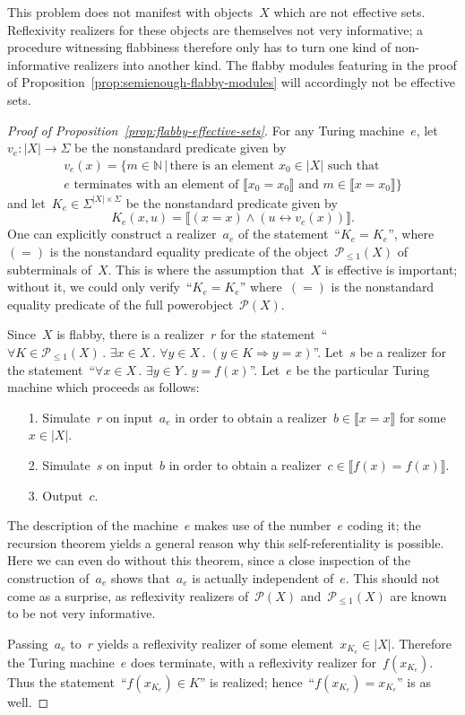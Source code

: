\documentclass[oneside]{amsart}
\theoremstyle{definition}
\theoremstyle{plain}
\theoremstyle{remark}
\newcommand{\NN}{\mathbb{N}}
\renewcommand{\P}{\mathcal{P}}
\renewcommand{\_}{\mathpunct{.}\,}
\begin{document}
This problem does not manifest with objects~$X$ which are not effective sets.
Reflexivity realizers for these objects are themselves not very informative;
a procedure witnessing flabbiness therefore only has to turn one kind of
non-informative realizers into another kind. The flabby modules featuring in
the proof of Proposition~\ref{prop:semienough-flabby-modules} will accordingly
not be effective sets.

\begin{proof}[Proof of Proposition~\ref{prop:flabby-effective-sets}]
For any Turing machine~$e$, let~$v_e : |X| \to \Sigma$ be the nonstandard
predicate given by
\begin{multline*}
  v_e(x) = \{ m \in \NN \,|\,
  \text{there is an element~$x_0 \in |X|$ such that} \\
  \text{$e$ terminates with an element of~$\llbracket x_0 = x_0 \rrbracket$ and
  $m \in \llbracket x = x_0 \rrbracket$} \}
\end{multline*}
and let~$K_e \in \Sigma^{|X| \times \Sigma}$ be the nonstandard predicate given by
\[ K_e(x,u) = \llbracket (x = x) \wedge (u \leftrightarrow v_e(x)) \rrbracket. \]
One can explicitly construct a realizer~$a_e$ of the statement~``$K_e = K_e$'',
where~$({=})$ is the nonstandard equality predicate of the object~$\P_{\leq1}(X)$
of subterminals of~$X$. This is where the assumption that~$X$ is effective is
important; without it, we could only verify~``$K_e = K_e$'' where~$({=})$ is
the nonstandard equality predicate of the full powerobject~$\P(X)$.

Since~$X$ is flabby, there is a realizer~$r$ for the statement~``$\forall K \in
\P_{\leq1}(X)\_ \exists x \in X\_ \forall y \in X\_ (y \in K \Rightarrow y =
x)$''. Let~$s$ be a realizer for the statement~``$\forall x \in X\_ \exists y
\in Y\_ y = f(x)$''. Let~$e$ be the particular Turing machine which proceeds as
follows:
\begin{enumerate}
\item[1.] Simulate~$r$ on input~$a_e$ in order to obtain a realizer~$b \in
\llbracket x = x \rrbracket$ for some~$x \in |X|$.
\item[2.] Simulate~$s$ on input~$b$ in order to obtain a realizer~$c \in \llbracket
f(x) = f(x) \rrbracket$.
\item[3.] Output~$c$.
\end{enumerate}
The description of the machine~$e$ makes use of the number~$e$ coding it;
the recursion theorem yields a general reason why this self-referentiality is
possible. Here we can even do without this theorem, since a close inspection of
the construction of~$a_e$ shows that~$a_e$ is actually independent of~$e$. This
should not come as a surprise, as reflexivity realizers of~$\P(X)$
and~$\P_{\leq1}(X)$ are known to be not very informative.

Passing~$a_e$ to~$r$ yields a reflexivity realizer of some element~$x_{K_e} \in
|X|$. Therefore the Turing machine~$e$ does terminate, with a reflexivity
realizer for~$f(x_{K_e})$. Thus the statement~``$f(x_{K_e}) \in K$'' is
realized; hence~``$f(x_{K_e}) = x_{K_e}$'' is as well.
\end{proof}
\end{document}
